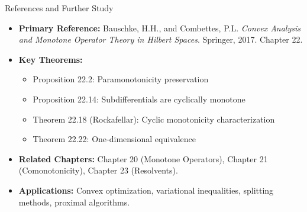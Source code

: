 \documentclass[aspectratio=169,10pt]{beamer}
\begin{document}
\begin{frame}{References and Further Study}
    \begin{itemize}
        \item \textbf{Primary Reference:} Bauschke, H.H., and Combettes, P.L.
              \emph{Convex Analysis and Monotone Operator Theory in Hilbert Spaces}.
              Springer, 2017. Chapter 22.

        \item \textbf{Key Theorems:}
            \begin{itemize}
                \item Proposition 22.2: Paramonotonicity preservation
                \item Proposition 22.14: Subdifferentials are cyclically monotone
                \item Theorem 22.18 (Rockafellar): Cyclic monotonicity characterization
                \item Theorem 22.22: One-dimensional equivalence
            \end{itemize}

        \item \textbf{Related Chapters:} Chapter 20 (Monotone Operators),
              Chapter 21 (Comonotonicity), Chapter 23 (Resolvents).

        \item \textbf{Applications:} Convex optimization, variational inequalities,
              splitting methods, proximal algorithms.
    \end{itemize}
\end{frame}
\end{document}
